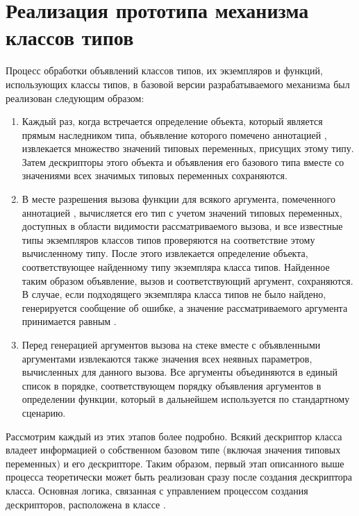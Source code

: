 \section{Реализация прототипа механизма классов типов}

Процесс обработки объявлений классов типов, их экземпляров и функций, использующих классы типов, в базовой версии разрабатываемого механизма был реализован следующим образом:  
\begin{enumerate}
    \item Каждый раз, когда встречается определение объекта, который является прямым наследником типа, объявление которого помечено аннотацией , извлекается множество значений типовых переменных, присущих этому типу. Затем дескрипторы этого объекта и объявления его базового типа вместе со значениями всех значимых типовых переменных сохраняются. 
    \item В месте разрешения вызова функции для всякого аргумента, помеченного аннотацией , вычисляется его тип с учетом значений типовых переменных, доступных в области видимости рассматриваемого вызова, и все известные типы экземпляров классов типов проверяются на соответствие этому вычисленному типу. После этого извлекается определение объекта, соответствующее найденному типу экземпляра класса типов. Найденное таким образом объявление, вызов и соответствующий аргумент, сохраняются. В случае, если подходящего экземпляра класса типов не было найдено, генерируется сообщение об ошибке, а значение рассматриваемого аргумента принимается равным . 
    \item Перед генерацией аргументов вызова на стеке вместе с объявленными аргументами извлекаются также значения всех неявных параметров, вычисленных для данного вызова. Все аргументы объединяются в единый список в порядке, соответствующем порядку объявления аргументов в определении функции, который в дальнейшем используется по стандартному сценарию.    
\end{enumerate}   
Рассмотрим каждый из этих этапов более подробно. Всякий дескриптор класса владеет информацией о собственном базовом типе (включая значения типовых переменных) и его дескрипторе. Таким образом, первый этап описанного выше процесса теоретически может быть реализован сразу после создания дескриптора класса. Основная логика, связанная с управлением процессом создания дескрипторов, расположена в классе . 

